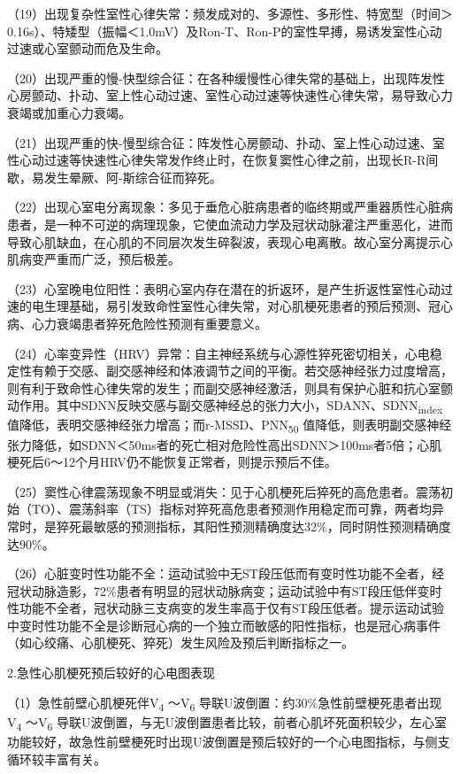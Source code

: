 （19）出现复杂性室性心律失常：频发成对的、多源性、多形性、特宽型（时间＞0.16s）、特矮型（振幅＜1.0mV）及Ron-T、Ron-P的室性早搏，易诱发室性心动过速或心室颤动而危及生命。

（20）出现严重的慢-快型综合征：在各种缓慢性心律失常的基础上，出现阵发性心房颤动、扑动、室上性心动过速、室性心动过速等快速性心律失常，易导致心力衰竭或加重心力衰竭。

（21）出现严重的快-慢型综合征：阵发性心房颤动、扑动、室上性心动过速、室性心动过速等快速性心律失常发作终止时，在恢复窦性心律之前，出现长R-R间歇，易发生晕厥、阿-斯综合征而猝死。

（22）出现心室电分离现象：多见于垂危心脏病患者的临终期或严重器质性心脏病患者，是一种不可逆的病理现象，它使血流动力学及冠状动脉灌注严重恶化，进而导致心肌缺血，在心肌的不同层次发生碎裂波，表现心电离散。故心室分离提示心肌病变严重而广泛，预后极差。

（23）心室晚电位阳性：表明心室内存在潜在的折返环，是产生折返性室性心动过速的电生理基础，易引发致命性室性心律失常，对心肌梗死患者的预后预测、冠心病、心力衰竭患者猝死危险性预测有重要意义。

（24）心率变异性（HRV）异常：自主神经系统与心源性猝死密切相关，心电稳定性有赖于交感、副交感神经和体液调节之间的平衡。若交感神经张力过度增高，则有利于致命性心律失常的发生；而副交感神经激活，则具有保护心脏和抗心室颤动作用。其中SDNN反映交感与副交感神经总的张力大小，SDANN、SDNN\textsubscript{index}
值降低，表明交感神经张力增高；而r-MSSD、PNN\textsubscript{50}
值降低，则表明副交感神经张力降低，如SDNN＜50ms者的死亡相对危险性高出SDNN＞100ms者5倍；心肌梗死后6～12个月HRV仍不能恢复正常者，则提示预后不佳。

（25）窦性心律震荡现象不明显或消失：见于心肌梗死后猝死的高危患者。震荡初始（TO）、震荡斜率（TS）指标对猝死高危患者预测作用稳定而可靠，两者均异常时，是猝死最敏感的预测指标，其阳性预测精确度达32\%，同时阴性预测精确度达90\%。

（26）心脏变时性功能不全：运动试验中无ST段压低而有变时性功能不全者，经冠状动脉造影，72\%患者有明显的冠状动脉病变；运动试验中有ST段压低伴变时性功能不全者，冠状动脉三支病变的发生率高于仅有ST段压低者。提示运动试验中变时性功能不全是诊断冠心病的一个独立而敏感的阳性指标，也是冠心病事件（如心绞痛、心肌梗死、猝死）发生风险及预后判断指标之一。

2.急性心肌梗死预后较好的心电图表现

（1）急性前壁心肌梗死伴V\textsubscript{4} ～V\textsubscript{6}
导联U波倒置：约30\%急性前壁梗死患者出现V\textsubscript{4}
～V\textsubscript{6}
导联U波倒置，与无U波倒置患者比较，前者心肌坏死面积较少，左心室功能较好，故急性前壁梗死时出现U波倒置是预后较好的一个心电图指标，与侧支循环较丰富有关。

